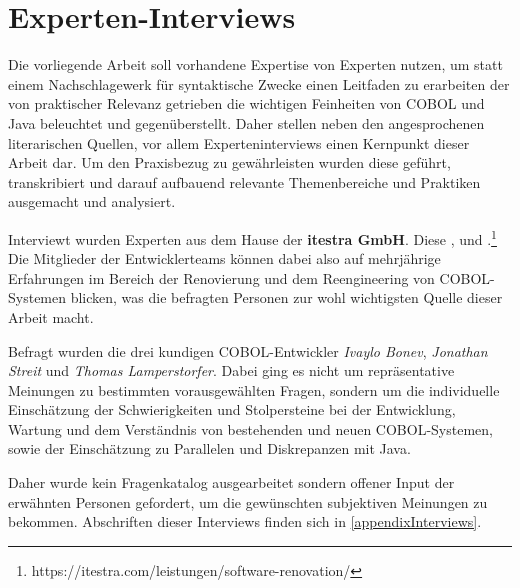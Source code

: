 \section{Experten-Interviews}\label{interviews}
Die vorliegende Arbeit soll vorhandene Expertise von Experten nutzen, um statt einem Nachschlagewerk für syntaktische Zwecke einen Leitfaden zu erarbeiten der von praktischer Relevanz getrieben die wichtigen Feinheiten von COBOL und Java beleuchtet und gegenüberstellt. Daher stellen neben den angesprochenen literarischen Quellen, vor allem Experteninterviews einen Kernpunkt dieser Arbeit dar. Um den Praxisbezug zu gewährleisten wurden diese geführt, transkribiert und darauf aufbauend relevante Themenbereiche und Praktiken ausgemacht und analysiert.

Interviewt wurden Experten aus dem Hause der \textbf{itestra GmbH}. Diese ,  und .\footnote{\label{itestraFootnote}https://itestra.com/leistungen/software-renovation/} Die Mitglieder der Entwicklerteams können dabei also auf mehrjährige Erfahrungen im Bereich der Renovierung und dem Reengineering von COBOL-Systemen blicken, was die befragten Personen zur wohl wichtigsten Quelle dieser Arbeit macht.

Befragt wurden die drei kundigen COBOL-Entwickler \textit{Ivaylo Bonev}, \textit{Jonathan Streit} und \textit{Thomas Lamperstorfer}. Dabei ging es nicht um repräsentative Meinungen zu bestimmten vorausgewählten Fragen, sondern um die individuelle Einschätzung der Schwierigkeiten und Stolpersteine bei der Entwicklung, Wartung und dem Verständnis von bestehenden und neuen COBOL-Systemen, sowie der Einschätzung zu Parallelen und Diskrepanzen mit Java. 

Daher wurde kein Fragenkatalog ausgearbeitet sondern offener Input der erwähnten Personen gefordert, um die gewünschten subjektiven Meinungen zu bekommen. Abschriften dieser Interviews finden sich in \autoref{appendixInterviews}.
